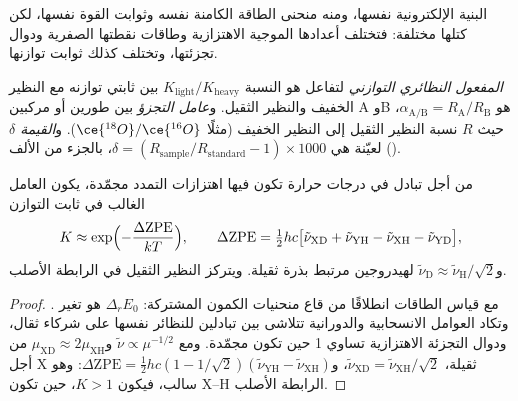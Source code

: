  البنية الإلكترونية نفسها، ومنه منحنى الطاقة
الكامنة نفسه وثوابت القوة نفسها، لكن كتلها مختلفة: فتختلف أعدادها الموجية
الاهتزازية وطاقات نقطتها الصفرية ودوال تجزئتها، وتختلف كذلك
ثوابت توازنها.

\begin{definition}\label{def:b3:statistical-thermo-applied:isotope-effect}
\emph{المفعول النظائري التوازني} لتفاعل
هو النسبة $K_{\mathrm{light}}/K_{\mathrm{heavy}}$ بين ثابتي توازنه مع
النظير الخفيف والنظير الثقيل. و\emph{عامل التجزؤ}
بين طورين أو مركبين A وB هو $\alpha_{\mathrm{A/B}} = R_{\mathrm A}/R_{\mathrm B}$، حيث
$R$ نسبة النظير الثقيل إلى النظير الخفيف (مثلًا $\ce{^{18}O}/\ce{^{16}O}$). 
و\emph{القيمة $\delta$} لعيّنة هي $\delta = (R_{\mathrm{sample}}/R_{\mathrm{standard}}
- 1) \times 1000$، بالجزء من الألف (\textperthousand).
\end{definition}

\begin{proposition}\label{prop:b3:statistical-thermo-applied:zpe-isotope}
من أجل تبادل  في درجات حرارة تكون فيها اهتزازات
التمدد مجمّدة، يكون العامل الغالب في ثابت التوازن
\[
  K \approx \exp\Bigl(-\frac{\Delta\mathrm{ZPE}}{kT}\Bigr), \qquad
  \Delta\mathrm{ZPE} = \tfrac12hc\bigl[\tilde\nu_{\mathrm{XD}} + \tilde\nu_{\mathrm{YH}} - \tilde\nu_{\mathrm{XH}} - \tilde\nu_{\mathrm{YD}}\bigr],
\]
و$\tilde\nu_{\mathrm D} \approx \tilde\nu_{\mathrm H}/\sqrt2$ لهيدروجين مرتبط بذرة ثقيلة. ويتركز النظير
الثقيل في الرابطة الأصلب.
\end{proposition}

\begin{proof}
 مع قياس الطاقات انطلاقًا
من قاع منحنيات الكمون المشتركة: $\Delta_rE_0$ هو تغير
. وتكاد العوامل الانسحابية والدورانية تتلاشى
بين تبادلين للنظائر نفسها على شركاء ثقال، 
ودوال التجزئة الاهتزازية تساوي 1 حين تكون مجمّدة. ومع $\tilde\nu \propto \mu^{-1/2}$ 
و$\mu_{\mathrm{XD}} \approx 2\mu_{\mathrm{XH}}$ من أجل X ثقيلة، $\tilde\nu_{\mathrm{XD}} = \tilde\nu_{\mathrm{XH}}/\sqrt2$، و$\Delta\mathrm{ZPE} =
\frac12hc(1 - 1/\sqrt2)(\tilde\nu_{\mathrm{YH}} - \tilde\nu_{\mathrm{XH}})$: وهو سالب، فيكون $K > 1$، حين تكون X--H
الرابطة الأصلب.
\end{proof}

